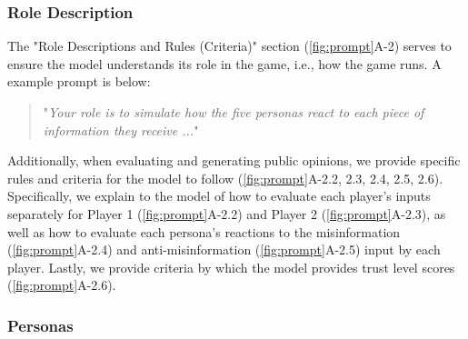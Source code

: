 \subsubsection{Role Description}
The "Role Descriptions and Rules (Criteria)" section (\autoref{fig:prompt}A-2) serves to ensure the model understands its role in the game, i.e., how the game runs. A example prompt is below:
\begin{quote}
    "\textit{Your role is to simulate how the five personas react to each piece of information they receive ...}"
\end{quote}
Additionally, when evaluating and generating public opinions, we provide specific rules and criteria  for the model to follow (\autoref{fig:prompt}A-2.2, 2.3, 2.4, 2.5, 2.6). Specifically, we explain to the model of how to evaluate each player’s inputs separately for Player 1 (\autoref{fig:prompt}A-2.2) and Player 2 (\autoref{fig:prompt}A-2.3), as well as how to evaluate each persona’s reactions to the misinformation (\autoref{fig:prompt}A-2.4) and anti-misinformation (\autoref{fig:prompt}A-2.5) input by each player. Lastly, we provide criteria by which the model provides trust level scores (\autoref{fig:prompt}A-2.6).


\subsubsection{Personas}
\label{Personas}

